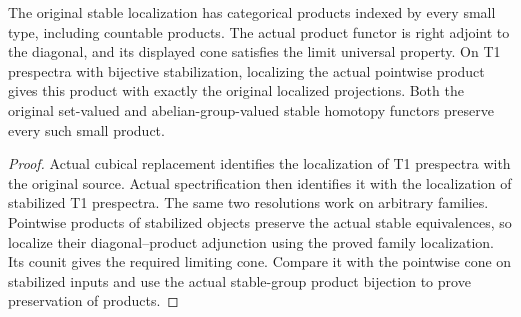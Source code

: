 \begin{proposition}
  \leanok
  The original stable localization has categorical products indexed by every small type, including countable products. The actual product functor is right adjoint to the diagonal, and its displayed cone satisfies the limit universal property. On T1 prespectra with bijective stabilization, localizing the actual pointwise product gives this product with exactly the original localized projections. Both the original set-valued and abelian-group-valued stable homotopy functors preserve every such small product.
\end{proposition}
\begin{proof}
  Actual cubical replacement identifies the localization of T1 prespectra with the original source. Actual spectrification then identifies it with the localization of stabilized T1 prespectra. The same two resolutions work on arbitrary families. Pointwise products of stabilized objects preserve the actual stable equivalences, so localize their diagonal--product adjunction using the proved family localization. Its counit gives the required limiting cone. Compare it with the pointwise cone on stabilized inputs and use the actual stable-group product bijection to prove preservation of products.
  \leanok
\end{proof}

